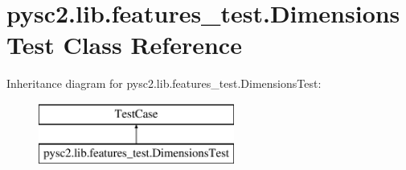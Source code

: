 \hypertarget{classpysc2_1_1lib_1_1features__test_1_1_dimensions_test}{}\section{pysc2.\+lib.\+features\+\_\+test.\+Dimensions\+Test Class Reference}
\label{classpysc2_1_1lib_1_1features__test_1_1_dimensions_test}
Inheritance diagram for pysc2.\+lib.\+features\+\_\+test.\+Dimensions\+Test\+:\begin{figure}[H]
\begin{center}
\leavevmode
\includegraphics[height=2.000000cm]{classpysc2_1_1lib_1_1features__test_1_1_dimensions_test}
\end{center}
\end{figure}
